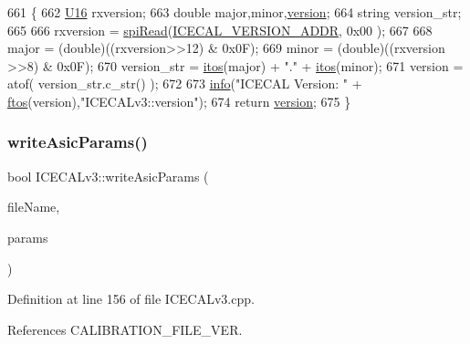 \begin{DoxyCode}
661 \{
662     \hyperlink{ICECALv3_8h_adf928e51a60dba0df29d615401cc55a8}{U16} rxversion;
663     \textcolor{keywordtype}{double} major,minor,\hyperlink{classICECALv3_a7f3f8012d2e5c45f8e43819befa3f915}{version};
664     \textcolor{keywordtype}{string} version\_str;
665 
666     rxversion = \hyperlink{classICECALv3_aced41ce20a0853d6248b8df88412e57a}{spiRead}(\hyperlink{ICECALv3_8h_a46a6446285e0e7808feebc4bc9ef52e1}{ICECAL\_VERSION\_ADDR}, 0x00 );
667 
668     major = (double)((rxversion>>12) & 0x0F); 
669     minor = (double)((rxversion >>8) & 0x0F);
670     version\_str = \hyperlink{Tools_8h_af330027dbdafb9a30768b3613c553e60}{itos}(major) + \textcolor{stringliteral}{"."} + \hyperlink{Tools_8h_af330027dbdafb9a30768b3613c553e60}{itos}(minor);
671     version = atof( version\_str.c\_str() );
672 
673     \hyperlink{classObject_a644fd329ea4cb85f54fa6846484b84a8}{info}(\textcolor{stringliteral}{"ICECAL Version: "} + \hyperlink{Tools_8h_ae78000c70889d75d67813c6cb83010a6}{ftos}(version),\textcolor{stringliteral}{"ICECALv3::version"});
674     \textcolor{keywordflow}{return} \hyperlink{classICECALv3_a7f3f8012d2e5c45f8e43819befa3f915}{version};
675 \}
\end{DoxyCode}
\mbox{\label{classICECALv3_a9d7c33e6d113e7f721dc848d28ab44d8}} 
\subsubsection{\texorpdfstring{write\+Asic\+Params()}{writeAsicParams()}}
{\footnotesize\ttfamily bool I\+C\+E\+C\+A\+Lv3\+::write\+Asic\+Params (\begin{DoxyParamCaption}\item[{string}]{file\+Name,  }\item[{Py\+Object $\ast$}]{params }\end{DoxyParamCaption})\hspace{0.3cm}{\ttfamily [private]}}



Definition at line 156 of file I\+C\+E\+C\+A\+Lv3.\+cpp.



References C\+A\+L\+I\+B\+R\+A\+T\+I\+O\+N\+\_\+\+F\+I\+L\+E\+\_\+\+V\+ER.



